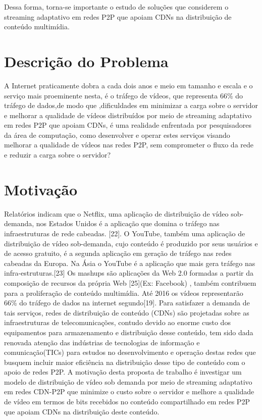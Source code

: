 \documentclass[
	12pt,
	oneside,
	a4paper,
	english,
	brazil
	]{abntex2ppgsi}
\begin{document}
Dessa forma, torna-se importante o estudo de soluções que considerem o streaming adaptativo em redes P2P que apoiam CDNs na distribuição de conteúdo multimídia.

\section{Descrição do Problema}
 
A Internet praticamente dobra a cada dois anos e meio em tamanho e escala e o serviço mais proeminente nesta, é o tráfego de vídeos, que representa 66\% do tráfego de dados,de modo que ,dificuldades em minimizar a carga sobre o servidor e melhorar a qualidade de vídeos distribuídos por meio de streaming adaptativo em redes P2P que apoiam CDNs, é uma realidade enfrentada por pesquisadores da área de computação,  como desenvolver e operar estes serviços visando melhorar a qualidade de vídeos nas redes P2P, sem comprometer o fluxo da rede e reduzir a carga sobre o servidor?

\section{Motivação}

Relatórios indicam que o Netflix, uma aplicação de distribuição de vídeo sob-demanda, nos Estados Unidos é a aplicação que domina o tráfego nas infraestruturas de rede cabeadas. [22]. O YouTube, também uma aplicação de distribuição de vídeo sob-demanda, cujo conteúdo é produzido por seus usuários e de acesso gratuito, é a segunda aplicação em geração de tráfego nas redes cabeadas da Europa. Na Ásia o YouTube é a aplicação que mais gera tráfego nas infra-estruturas.[23]
Os mashups são aplicações da Web 2.0 formadas a partir da composição de recursos da própria Web [25](Ex: Facebook) , também contribuem para a proliferação de conteúdo multimídia. Até 2016 os vídeos representarão 66\% do tráfego de dados na internet segundo[19].
Para satisfazer a demanda de tais serviços, redes de distribuição de conteúdo (CDNs) são projetadas sobre as infraestruturas de telecomunicações, contudo devido ao enorme custo dos equipamentos para armazenamento e distribuição desse conteúdo, tem sido dada renovada atenção das indústrias de tecnologias de informação e comunicação(TICs) para estudos no desenvolvimento e operação destas redes que busquem incluir maior eficiência na distribuição desse tipo de conteúdo com o apoio de redes P2P.
A motivação desta proposta de trabalho é investigar  um modelo de distribuição de vídeo sob demanda por meio de streaming adaptativo em redes CDN-P2P que minimize o custo sobre o servidor e melhore a qualidade de vídeo em termos de bits recebidos no conteúdo compartilhado em redes P2P que apoiam CDNs na distribuição deste conteúdo.
\end{document}
